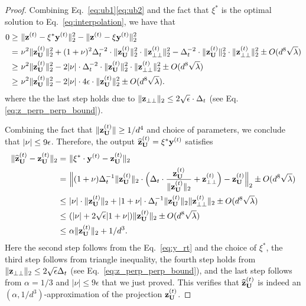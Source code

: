 \begin{proof}
Combining Eq.~\eqref{eq:ub1}\eqref{eq:ub2} and the fact that $\xi^{*}$ is the optimal solution to Eq.~\eqref{eq:interpolation}, we have that
\begin{align*}
0 \geq &~ \|\mathbf{z}^{(t)} - \xi^{*} \mathbf{y}^{(t)}\|_2^2 - \|\mathbf{z}^{(t)} - \xi\mathbf{y}^{(t)}\|_2^2 \\
= &~ \nu^2 \|\mathbf{z}_{\mathbf{U}}^{(t)}\|_2^2 + (1+\nu)^2 \Delta_{t}^{-2} \cdot \|\mathbf{z}_{\mathbf{U}}^{(t)}\|_2^2 \cdot \|\mathbf{z}_{\perp\perp}^{(t)}\|_2^2 - \Delta_{t}^{-2} \cdot \|\mathbf{z}_{\mathbf{U}}^{(t)}\|_2^2 \cdot \|\mathbf{z}_{\perp\perp}^{(t)}\|_2^2 \pm O(d^{8}\sqrt{\lambda})\\
\geq &~ \nu^2 \|\mathbf{z}_{\mathbf{U}}^{(t)}\|_2^2 - 2|\nu| \cdot \Delta_{t}^{-2} \cdot \|\mathbf{z}_{\mathbf{U}}^{(t)}\|_2^2 \cdot \|\mathbf{z}_{\perp\perp}^{(t)}\|_2^2  \pm O(d^{8}\sqrt{\lambda})\\
\geq &~ \nu^2 \|\mathbf{z}_{\mathbf{U}}^{(t)}\|_2^2 - 2|\nu| \cdot 4\epsilon \cdot \|\mathbf{z}_{\mathbf{U}}^{(t)}\|_2^2 \pm O(d^{8}\sqrt{\lambda}).
\end{align*}
where the the last step holds due to $\|\mathbf{z}_{\perp\perp}\|_2 \leq 2\sqrt{\epsilon} \cdot \Delta_{t}$ (see Eq. \eqref{eq:z_perp_perp_bound}).


Combining the fact that $\|\mathbf{z}_{\mathbf{U}}^{(t)}\|\geq 1/d^4$ and choice of parameters, we conclude that $|\nu| \leq 9\epsilon$. Therefore, the output $\widehat{\mathbf{z}}_{\mathbf{U}}^{(t)} = \xi^{*}\mathbf{y}^{(t)}$ satisfies
\begin{align*}
\|\widehat{\mathbf{z}}_{\mathbf{U}}^{(t)} - \mathbf{z}_{\mathbf{U}}^{(t)}\|_2 = &~ \|\xi^{*} \cdot \mathbf{y}^{(t)} - \mathbf{z}_{\mathbf{U}}^{(t)}\|_2\\
= &~ \Big\| (1 + \nu)\Delta_t^{-1}\|\mathbf{z}_{\mathbf{U}}^{(t)}\|_2 \cdot \Big(\Delta_{t}\cdot  \frac{\mathbf{z}^{(t)}_{\mathbf{U}}}{\|\mathbf{z}_{\mathbf{U}}^{(t)}\|_2} + \mathbf{z}_{\perp\perp}^{(t)}\Big)  - \mathbf{z}_{\mathbf{U}}^{(t)} \Big \|_2 \pm O(d^8\sqrt{\lambda})\\
\leq &~ |\nu| \cdot \|\mathbf{z}_{\mathbf{U}}^{(t)}\|_2 + |1+\nu| \cdot \Delta_t^{-1}\|\mathbf{z}_{\mathbf{U}}^{(t)}\|_2 \|\mathbf{z}_{\perp\perp}^{(t)}\|_2 \pm O(d^8\sqrt{\lambda})\\
\leq &~ (|\nu| + 2\sqrt{\epsilon}|1+\nu|)\|\mathbf{z}_{\mathbf{U}}^{(t)}\|_2 \pm O(d^8\sqrt{\lambda})\\
\leq &~ \alpha \|\mathbf{z}_{\mathbf{U}}^{(t)}\|_2 + 1/d^3.
\end{align*}
Here the second step follows from the Eq.~\eqref{eq:y_rt} and the choice of $\xi^{*}$, the third step follows from triangle inequality, the fourth step holds from $\|\mathbf{z}_{\perp\perp}\|_2 \leq 2\sqrt{\epsilon}\Delta_{t}$ (see Eq.~\eqref{eq:z_perp_perp_bound}), and the last step follows from $\alpha = 1/3$ and $|\nu| \leq 9 \epsilon$ that we just proved.
This verifies that $\widehat{\mathbf{z}}_{\mathbf{U}}^{(t)}$ is indeed an $(\alpha, 1/d^3)$-approximation of the projection $\mathbf{z}_{\mathbf{U}}^{(t)}$.



\end{proof}
